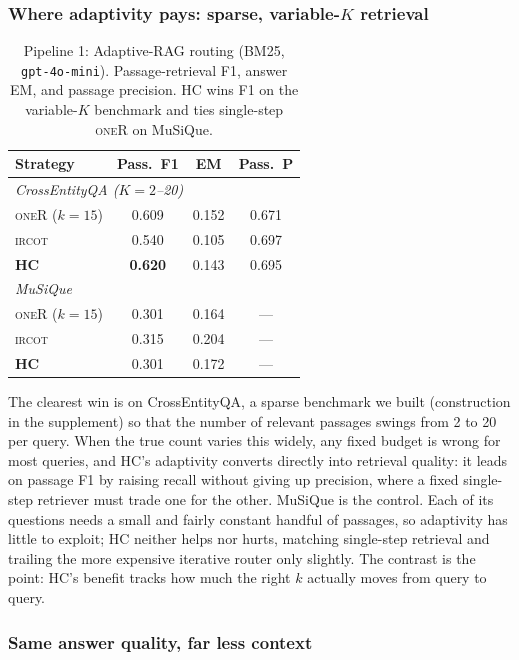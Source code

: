 \documentclass[letterpaper]{article} %
\newcommand{\CEqaFHC}{0.620}\newcommand{\CEqaFoner}{0.609}\newcommand{\CEqaFircot}{0.540}
\newcommand{\MusFHC}{0.301}\newcommand{\MusFoner}{0.301}\newcommand{\MusFircot}{0.315}
\begin{document}
\subsubsection{Where adaptivity pays: sparse, variable-$K$ retrieval}

\begin{table}[t]
\centering\small
\setlength{\extrarowheight}{1.5pt}
\begin{tabular}{|l|c|c|c|}
\hline
\textbf{Strategy} & \textbf{Pass.\ F1} & \textbf{EM} & \textbf{Pass.\ P} \\
\hline
\multicolumn{4}{|l|}{\emph{CrossEntityQA ($K{=}2$--20)}}\\
\hline
\textsc{oneR} ($k{=}15$) & \CEqaFoner & 0.152 & 0.671 \\
\hline
\textsc{ircot} & \CEqaFircot & 0.105 & 0.697 \\
\hline
\textbf{HC} & \textbf{\CEqaFHC} & 0.143 & 0.695 \\
\hline
\multicolumn{4}{|l|}{\emph{MuSiQue}}\\
\hline
\textsc{oneR} ($k{=}15$) & \MusFoner & 0.164 & --- \\
\hline
\textsc{ircot} & \MusFircot & 0.204 & --- \\
\hline
\textbf{HC} & \MusFHC & 0.172 & --- \\
\hline
\end{tabular}
\caption{Pipeline 1: Adaptive-RAG routing (BM25, \texttt{gpt-4o-mini}).
Passage-retrieval F1, answer EM, and passage precision. HC wins F1 on the
variable-$K$ benchmark and ties single-step \textsc{oneR} on MuSiQue.}
\label{tab:p1a}
\end{table}

The clearest win is on CrossEntityQA, a sparse benchmark we built
(construction in the supplement) so that the number of relevant passages
swings from 2 to 20 per query. When the true count varies this widely,
any fixed budget is wrong for most queries, and HC's adaptivity converts
directly into retrieval quality: it leads on passage F1 by raising recall
without giving up precision, where a fixed single-step retriever must
trade one for the other. MuSiQue is the control. Each of its questions
needs a small and fairly constant handful of passages, so adaptivity has
little to exploit; HC neither helps nor hurts, matching single-step
retrieval and trailing the more expensive iterative router only slightly.
The contrast is the point: HC's benefit tracks how much the right $k$
actually moves from query to query.

\subsubsection{Same answer quality, far less context}
\end{document}
